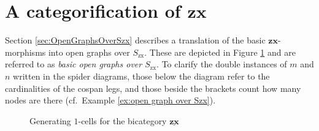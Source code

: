 \documentclass[./1--Catfying_zxCalc--Master.tex]{subfiles} %
\begin{document}
%

\section{A categorification of $\mathbf{zx}$}
\label{sec:zx categorified}

Section \ref{sec:OpenGraphsOverSzx} 
describes a translation of
the basic $\mathbf{zx}$-morphisms 
into open graphs over $S_{\text{zx}}$.
These are depicted in 
Figure \ref{fig:ZX 1cells generators}
and are referred to as 
\emph{basic open graphs over $S_{\text{zx}}$}.  
To clarify the double instances of $m$ and $n$ 
written in the spider diagrams, 
those below the diagram 
refer to the cardinalities of the cospan legs, 
and those beside the brackets 
count how many nodes are there
(cf.\ Example \ref{ex:open graph over Szx}).  

\begin{figure}[h]
	\caption{
		Generating $1$-cells for the bicategory $\underline{\mathbf{zx}}$ }
	\label{fig:ZX 1cells generators}
\end{figure} 
\end{document}
